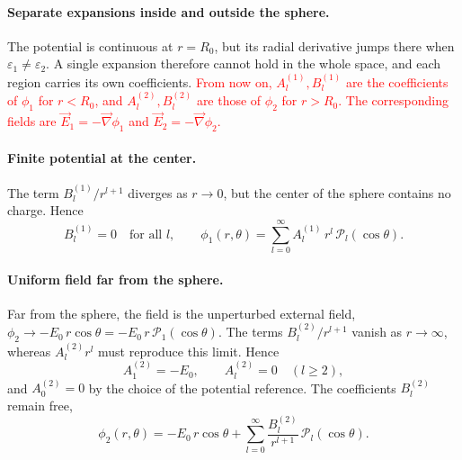\paragraph{Separate expansions inside and outside the sphere.}
The potential is continuous at $r = R_0$, but its radial derivative jumps there when $\varepsilon_1 \neq \varepsilon_2$. A single expansion therefore cannot hold in the whole space, and each region carries its own coefficients. \textcolor{red}{From now on, $A_l^{(1)}, B_l^{(1)}$ are the coefficients of $\phi_1$ for $r < R_0$, and $A_l^{(2)}, B_l^{(2)}$ are those of $\phi_2$ for $r > R_0$. The corresponding fields are $\vec E_1 = -\vec\nabla\phi_1$ and $\vec E_2 = -\vec\nabla\phi_2$.}

\paragraph{Finite potential at the center.}
The term $B_l^{(1)}/r^{l+1}$ diverges as $r \to 0$, but the center of the sphere contains no charge. Hence
\begin{equation*}
    B_l^{(1)} = 0 \quad \text{for all } l,
    \qquad
    \phi_1(r,\theta) = \sum_{l=0}^{\infty} A_l^{(1)}\,r^l\,\mathcal{P}_l(\cos\theta).
\end{equation*}

\paragraph{Uniform field far from the sphere.}
Far from the sphere, the field is the unperturbed external field, $\phi_2 \to -E_0\,r\cos\theta = -E_0\,r\,\mathcal{P}_1(\cos\theta)$. The terms $B_l^{(2)}/r^{l+1}$ vanish as $r \to \infty$, whereas $A_l^{(2)}r^l$ must reproduce this limit. Hence
\begin{equation*}
    A_1^{(2)} = -E_0, \qquad A_l^{(2)} = 0 \quad (l \geq 2),
\end{equation*}
and $A_0^{(2)} = 0$ by the choice of the potential reference. The coefficients $B_l^{(2)}$ remain free,
\begin{equation*}
    \phi_2(r,\theta) = -E_0\,r\cos\theta + \sum_{l=0}^{\infty}\frac{B_l^{(2)}}{r^{l+1}}\,\mathcal{P}_l(\cos\theta).
\end{equation*}

